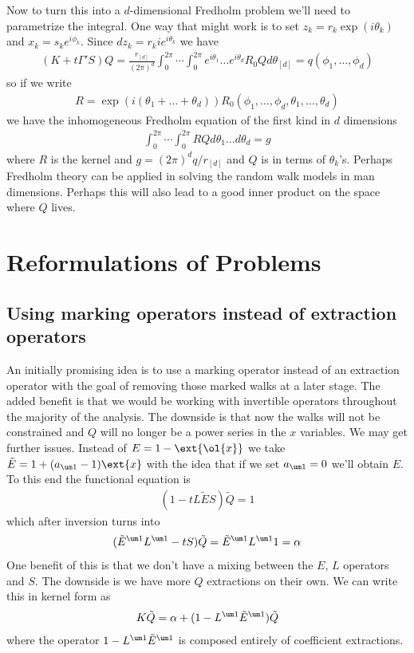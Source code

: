 Now to turn this into a $d$-dimensional Fredholm problem we'll need to parametrize the integral. One way that might work is to set $z_k = r_k \exp(i\theta_k)$ and $x_k = s_k e^{i\phi_k}$. Since $dz_k = r_k i e^{i\theta_k}$ we have
\begin{align}
(K+t\Gamma'S)Q = \frac{r_{[d]}}{(2\pi)^d}\int_0^{2\pi}\cdots\int_0^{2\pi} e^{i\theta_1}\ldots e^{i\theta_d}R_0Q d\theta_{[d]} = q(\phi_1,\ldots,\phi_d)
\end{align}
so if we write
\begin{align}
R = \exp(i(\theta_1+\ldots + \theta_d))R_0(\phi_1,\ldots,\phi_d,\theta_1,\ldots,\theta_d)
\end{align}
we have the inhomogeneous Fredholm equation of the first kind in $d$ dimensions
\begin{align}
	\int_0^{2\pi}\cdots\int_0^{2\pi} RQ d\theta_1\ldots d\theta_d= g
\end{align}
where $R$ is the kernel and $g = (2\pi)^dq/r_{[d]}$ and $Q$ is in terms of $\theta_k$'s. Perhaps Fredholm theory can be applied in solving the random walk models in man dimensions. Perhaps this will also lead to a good inner product on the space where $Q$ lives.

\section{Reformulations of Problems}

\subsection{Using marking operators instead of extraction operators}
An initially promising idea is to use a marking operator instead of an extraction operator with the goal of removing those marked walks at a later stage. The added benefit is that we would be working with invertible operators throughout the majority of the analysis. The downside is that now the walks will not be constrained and $Q$ will no longer be a power series in the $x$ variables. We may get further issues. Instead of $E = 1- \ext{\ol{x}}$ we take $\tilde E = 1 + (a_{\um 1}-1)\ext{x}$ with the idea that if we set $a_{\um 1} = 0$ we'll obtain $E$. To this end the functional equation is
\begin{align}
	(1-tL\tilde E S)\tilde Q = 1
\end{align}
which after inversion turns into
\begin{align}
	(\tilde E^{\um 1} L^{\um 1} -tS) \tilde Q = \tilde E^{\um 1} L^{\um 1} 1 = \alpha
\end{align}
One benefit of this is that we don't have a mixing between the $E$, $L$ operators and $S$. The downside is we have more $Q$ extractions on their own. We can write this in kernel form as
\begin{align}
	K \tilde Q = \alpha + (1 - L^{\um 1}\tilde E^{\um 1}) \tilde Q
\end{align}
where the operator $1- L^{\um 1}\tilde E^{\um 1}$ is composed entirely of coefficient extractions.
